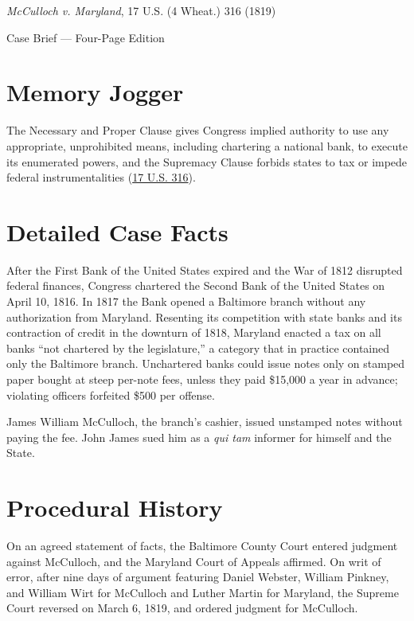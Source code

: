 \documentclass[12pt]{article}
\begin{document}
\begin{center}
{\LARGE \textit{McCulloch v. Maryland}, 17 U.S. (4 Wheat.) 316 (1819)\par}
\vspace{0.8em}
{\large Case Brief --- Four-Page Edition\par}
\end{center}
\vspace{1em}

\section{Memory Jogger}

The Necessary and Proper Clause gives Congress implied authority to use any appropriate, unprohibited means, including chartering a national bank, to execute its enumerated powers, and the Supremacy Clause forbids states to tax or impede federal instrumentalities (\href{https://supreme.justia.com/cases/federal/us/17/316/}{17 U.S. 316}).

\section{Detailed Case Facts}

After the First Bank of the United States expired and the War of 1812 disrupted federal finances, Congress chartered the Second Bank of the United States on April 10, 1816. In 1817 the Bank opened a Baltimore branch without any authorization from Maryland. Resenting its competition with state banks and its contraction of credit in the downturn of 1818, Maryland enacted a tax on all banks ``not chartered by the legislature,'' a category that in practice contained only the Baltimore branch. Unchartered banks could issue notes only on stamped paper bought at steep per-note fees, unless they paid \$15,000 a year in advance; violating officers forfeited \$500 per offense.

James William McCulloch, the branch's cashier, issued unstamped notes without paying the fee. John James sued him as a \textit{qui tam} informer for himself and the State.

\section{Procedural History}

On an agreed statement of facts, the Baltimore County Court entered judgment against McCulloch, and the Maryland Court of Appeals affirmed. On writ of error, after nine days of argument featuring Daniel Webster, William Pinkney, and William Wirt for McCulloch and Luther Martin for Maryland, the Supreme Court reversed on March 6, 1819, and ordered judgment for McCulloch.
\end{document}
